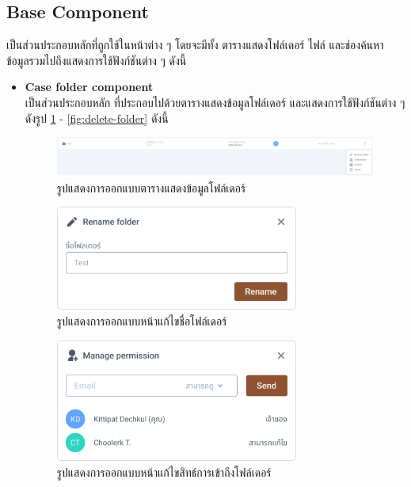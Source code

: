 \documentclass[12pt,oneside,openright,a4paper]{cpe-thai-project}
\begin{document}
\subsection{Base Component}
\hspace*{1cm} เป็นส่วนประกอบหลักที่ถูกใช้ในหน้าต่าง ๆ โดยจะมีทั้ง ตารางแสดงโฟล์เดอร์ ไฟล์ และช่องค้นหาข้อมูลรวมไปถึงแสดงการใช้ฟังก์ชันต่าง ๆ ดังนี้
\begin{itemize}
  \item \textbf{Case folder component} \\
\hspace*{1cm} เป็นส่วนประกอบหลัก ที่ประกอบไปด้วยตารางแสดงข้อมูลโฟล์เดอร์ และแสดงการใช้ฟังก์ชันต่าง ๆ ดังรูป \ref{fig:folder-component} - \ref{fig:delete-folder} ดังนี้
\begin{figure}[!h]\centering
  \includegraphics[width=13cm]{./assets/userinterface/folder-component.png}
  \caption{รูปแสดงการออกแบบตารางแสดงข้อมูลโฟล์เดอร์}\label{fig:folder-component}
\end{figure}

\begin{figure}[!h]\centering
  \includegraphics[width=8cm]{./assets/userinterface/rename-folder.png}
  \caption{รูปแสดงการออกแบบหน้าแก้ไขชื่อโฟล์เดอร์}\label{fig:rename-folder}
\end{figure}

\begin{figure}[!h]\centering
  \includegraphics[width=8cm]{./assets/userinterface/manage-folder-permission.png}
  \caption{รูปแสดงการออกแบบหน้าแก้ไขสิทธ์การเข้าถึงโฟล์เดอร์}\label{fig:manage-folder-permission}
\end{figure}


\end{itemize}
\end{document}
